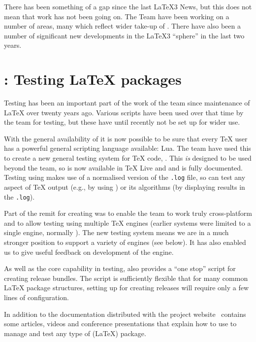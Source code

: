 \documentclass{ltnews}
\begin{document}
\maketitle

There has been something of a gap since the last \LaTeX3 News, but this does
not mean that work has not been going on. The Team have been working on a
number of areas, many which reflect wider take-up of . There have
also been a number of significant new developments in the \LaTeX3
\enquote{sphere} in the last two years.

\section{: Testing \LaTeX{} packages}

Testing has been an important part of the work of the team since maintenance of
\LaTeX{} over twenty years ago. Various scripts have been used over that time
by the team for testing, but these have until recently not be set up for wider
use.

With the general availability of  it is now possible to be sure
that every \TeX{} user has a powerful general scripting language available:
Lua. The team have used this to create a new general testing system for \TeX{}
code, . This \emph{is} designed to be used beyond the team, so is
now available in \TeX{} Live and  and is fully documented.
Testing using  makes use of a normalised version of the
\texttt{.log} file, so can test any aspect of \TeX{} output (e.g., by using
) or its algorithms (by displaying results in the \texttt{.log}).

Part of the remit for creating  was to enable the team to work
truly cross-platform and to allow testing using multiple \TeX{} engines
(earlier systems were limited to a single engine, normally \eTeX{}). The new
testing system means we are in a much stronger position to support a variety of
engines (see below). It has also enabled us to give useful feedback on
development of the  engine.

As well as the core capability in testing,  also provides a
\enquote{one stop} script for creating release bundles. The script is
sufficiently flexible that for many common \LaTeX{} package structures, setting
up for creating releases will require only a few lines of configuration.

In addition to the documentation distributed with  the project
website~\cite[publications in 2014]{project-publications} contains
some articles, videos and conference presentations that explain how to
use  to manage and test any type of (\LaTeX{}) package.
\end{document}
